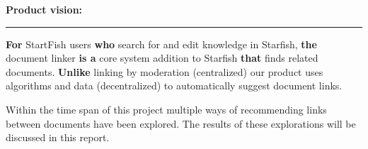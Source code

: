 \begin{shaded}
\textbf{{\large Product vision:}} \vspace{0.4\baselineskip} \hrule 
\vspace{1em}
{\large
\begin{spacing}{1.5}
	{\bf For} StartFish users {\bf who} search for and edit knowledge in Starfish,
	{\bf the} document linker {\bf is a} core system addition to Starfish
	{\bf that} finds related documents. {\bf Unlike} linking by moderation (centralized) our product uses algorithms and data (decentralized) to automatically suggest document links.
\end{spacing}
}
\end{shaded}


Within the time span of this project multiple ways of recommending links between documents have been explored. The results of these explorations will be discussed in this report. 